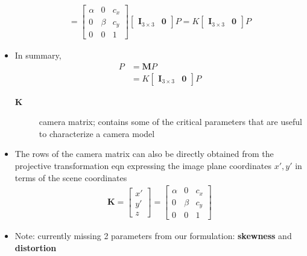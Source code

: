 \documentclass[letterpaper,12pt]{article}
\newcommand{\matr}[1]{\mathbf{#1}}
\begin{document}
\begin{itemize}
\begin{align}
        = \begin{bmatrix}
         \alpha & 0     & c_x \\
         0      & \beta & c_y \\
         0      & 0     & 1
        \end{bmatrix}
        \begin{bmatrix}
         \matr{I}_{3 \times 3} & \matr{0}
        \end{bmatrix} P
        = K \begin{bmatrix}
         \matr{I}_{3 \times 3} & \matr{0}
        \end{bmatrix} P
       \end{align}
 \item In summary,
       \begin{align}
        P & = \matr{M} P                     \\
          & = K \begin{bmatrix}
         \matr{I}_{3 \times 3} & \matr{0}
        \end{bmatrix} P
       \end{align}
       \begin{description}
        \item[$\matr{K}$] camera matrix; contains some of the critical parameters that are useful to characterize a camera model
       \end{description}
 \item The rows of the camera matrix can also be directly obtained from the projective transformation eqn expressing the image plane coordinates $x',y'$ in terms of the scene coordinates
       \begin{align}
        \matr{K} = \begin{bmatrix}
         x' \\
         y' \\
         z
        \end{bmatrix}
        = \begin{bmatrix}
         \alpha & 0     & c_x \\
         0      & \beta & c_y \\
         0      & 0     & 1
        \end{bmatrix}
       \end{align}
 \item Note: currently missing 2 parameters from our formulation: \textbf{skewness} and \textbf{distortion}
\end{itemize}
\end{document}
